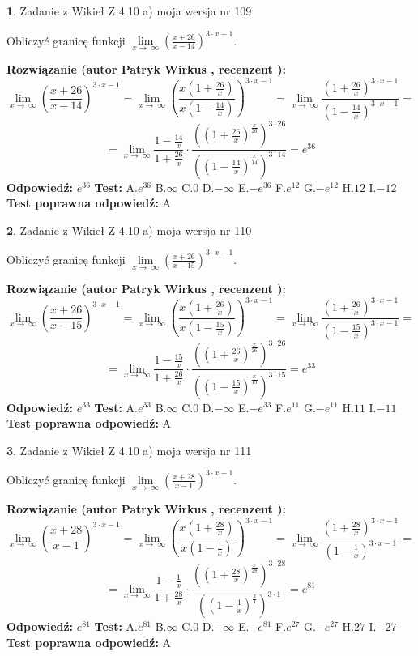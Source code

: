 \documentclass[12pt, a4paper]{article}
\theoremstyle{definition} %
\newtheorem{zad}{}
\newcommand{\zadStart}[1]{\begin{zad}#1\newline}
\newcommand{\zadStop}{\end{zad}}
\newcommand{\rozwStart}[2]{\noindent \textbf{Rozwiązanie (autor #1 , recenzent #2): }\newline}
\newcommand{\rozwStop}{\newline}
\newcommand{\odpStart}{\noindent \textbf{Odpowiedź:}\newline}
\newcommand{\odpStop}{\newline}
\newcommand{\testStart}{\noindent \textbf{Test:}\newline}
\newcommand{\testStop}{\newline}
\newcommand{\kluczStart}{\noindent \textbf{Test poprawna odpowiedź:}\newline}
\newcommand{\kluczStop}{\newline}
\begin{document}
\zadStart{Zadanie z Wikieł Z 4.10 a) moja wersja nr 109}

Obliczyć granicę funkcji  $\lim\limits_{x\to\ \infty}(\frac{x+26}{x-14})^{3\cdot x-1}$.
\zadStop
\rozwStart{Patryk Wirkus}{}
$$\lim\limits_{x\to\ \infty}(\frac{x+26}{x-14})^{3\cdot x-1} = \lim\limits_{x\to\ \infty}(\frac{x(1+\frac{26}{x})}{x(1-\frac{14}{x})})^{3\cdot x-1}=\lim\limits_{x\to\ \infty}\frac{(1+\frac{26}{x})^{3\cdot x-1}}{(1-\frac{14}{x})^{3\cdot x-1}}=$$
$$=\lim\limits_{x\to\ \infty}\frac{1-\frac{14}{x}}{1+\frac{26}{x}}\cdot\frac{((1+\frac{26}{x})^{\frac{x}{26}})^{3\cdot26}}{((1-\frac{14}{x})^{\frac{x}{14}})^{3\cdot14}}=e^{36}$$
\rozwStop
\odpStart
$e^{36}$
\odpStop
\testStart
A.$e^{36}$ B.$\infty$ C.$0$ D.$-\infty$ E.$-e^{36}$
F.$e^{12}$ G.$-e^{12}$
H.$12$
I.$-12$
\testStop
\kluczStart
A
\kluczStop



\zadStart{Zadanie z Wikieł Z 4.10 a) moja wersja nr 110}

Obliczyć granicę funkcji  $\lim\limits_{x\to\ \infty}(\frac{x+26}{x-15})^{3\cdot x-1}$.
\zadStop
\rozwStart{Patryk Wirkus}{}
$$\lim\limits_{x\to\ \infty}(\frac{x+26}{x-15})^{3\cdot x-1} = \lim\limits_{x\to\ \infty}(\frac{x(1+\frac{26}{x})}{x(1-\frac{15}{x})})^{3\cdot x-1}=\lim\limits_{x\to\ \infty}\frac{(1+\frac{26}{x})^{3\cdot x-1}}{(1-\frac{15}{x})^{3\cdot x-1}}=$$
$$=\lim\limits_{x\to\ \infty}\frac{1-\frac{15}{x}}{1+\frac{26}{x}}\cdot\frac{((1+\frac{26}{x})^{\frac{x}{26}})^{3\cdot26}}{((1-\frac{15}{x})^{\frac{x}{15}})^{3\cdot15}}=e^{33}$$
\rozwStop
\odpStart
$e^{33}$
\odpStop
\testStart
A.$e^{33}$ B.$\infty$ C.$0$ D.$-\infty$ E.$-e^{33}$
F.$e^{11}$ G.$-e^{11}$
H.$11$
I.$-11$
\testStop
\kluczStart
A
\kluczStop



\zadStart{Zadanie z Wikieł Z 4.10 a) moja wersja nr 111}

Obliczyć granicę funkcji  $\lim\limits_{x\to\ \infty}(\frac{x+28}{x-1})^{3\cdot x-1}$.
\zadStop
\rozwStart{Patryk Wirkus}{}
$$\lim\limits_{x\to\ \infty}(\frac{x+28}{x-1})^{3\cdot x-1} = \lim\limits_{x\to\ \infty}(\frac{x(1+\frac{28}{x})}{x(1-\frac{1}{x})})^{3\cdot x-1}=\lim\limits_{x\to\ \infty}\frac{(1+\frac{28}{x})^{3\cdot x-1}}{(1-\frac{1}{x})^{3\cdot x-1}}=$$
$$=\lim\limits_{x\to\ \infty}\frac{1-\frac{1}{x}}{1+\frac{28}{x}}\cdot\frac{((1+\frac{28}{x})^{\frac{x}{28}})^{3\cdot28}}{((1-\frac{1}{x})^{\frac{x}{1}})^{3\cdot1}}=e^{81}$$
\rozwStop
\odpStart
$e^{81}$
\odpStop
\testStart
A.$e^{81}$ B.$\infty$ C.$0$ D.$-\infty$ E.$-e^{81}$
F.$e^{27}$ G.$-e^{27}$
H.$27$
I.$-27$
\testStop
\kluczStart
A
\kluczStop
\end{document}
